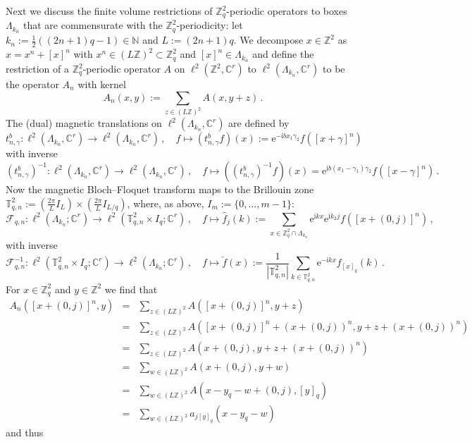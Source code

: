 \documentclass[a4paper]{article}
\newcommand{\T}{\mathbb{T}}
\newcommand{\e}{\mathrm{e}}
\renewcommand{\i}{\mathrm{i}}
\newcommand{\fd}{r}
\newcommand{\N}{\mathbb{N}}
\newcommand{\Z}{\mathbb{Z}}
\newcommand{\C}{\mathbb{C}}
\theoremstyle{plain}
\theoremstyle{definition}
\theoremstyle{remark}
\renewcommand{\(}{\left(}
\renewcommand{\)}{\right)}
\begin{document}
Next we discuss the finite volume restrictions
of $\Z^2_q$-periodic operators to boxes $\Lambda_{k_n}$ that are commensurate with the $\Z^2_q$-periodicity: let 
$k_n:= \frac{1}{2}((2n+1)q-1)\in\N$ and $L:= (2n+1)q$.
We decompose $x\in\Z^2$ as $x=x^n +[x]^n$ with $x^n\in(L\Z)^2\subset \Z^2_q$ and $[x]^n\in\Lambda_{k_n}$ and define the restriction of  a $\Z^2_q$-periodic operator $A$   on $\ell^2(\Z^2,\C^\fd)$   to $\ell^2(\Lambda_{k_n},\C^\fd)$ to be the operator $A_n$ with kernel
\[
A_n(x,y) := \sum_{z\in (L\Z)^2} A(x,y+z)\,.
\]
  The (dual) magnetic translations on $\ell^2(\Lambda_{k_n},\C^\fd)$ are   defined by
\[
t^b_{n,\gamma}:\ell^2(\Lambda_{k_n},\C^\fd)\to \ell^2(\Lambda_{k_n},\C^\fd)\,,\quad f \mapsto (t^b_{n,\gamma} f)(x) := \e^{-\i b x_1\gamma_2}f([x+\gamma]^{n})
\]
with inverse 
\[
(t^b_{n,\gamma})^{-1}:\ell^2(\Lambda_{k_n},\C^\fd)\to \ell^2(\Lambda_{k_n},\C^\fd)\,,\quad f \mapsto ((t^b_{n,\gamma})^{-1} f)(x)  = \e^{\i b (x_1-\gamma_1)\gamma_2}f([x-\gamma]^n)\,.
\]
Now the magnetic Bloch--Floquet transform maps to the   Brillouin zone $\T^2_{q,n}:=  \left(\frac{2\pi}{L}I_L\right)\times \left(\frac{2\pi}{ L} I_{L/q} \right) $, where, as above,  $I_m:=\{0,\ldots,m-1\}$:
\[
\mathcal{F}_{q,n}: \ell^2(\Lambda_{k_n};\C^{\fd}) \to \ell^2(\T^2_{q,n} \times I_q;\C^{\fd})\,,\quad f\mapsto \hat f_j(k) := \sum_{x\in\Z^2_q\cap \Lambda_{k_n}}\e^{\i k x} \e^{\i k_2 j} f([x+(0,j)]^n)\,,
\]
with inverse
\[
\mathcal{F}^{-1}_{q,n}:     \ell^2(\T^2_{q,n} \times I_q;\C^{\fd})\to \ell^2(\Lambda_{k_n};\C^{\fd})\,,\quad f \mapsto \check f(x) := \frac{1}{|\T^2_{q,n}|}\sum_{k\in\T^2_{q,n}} \e^{-\i k x} f_{[x]_q}(k)\,.
\]
For $x \in\Z^2_q$ and $y\in\Z^2$ we find that
\begin{eqnarray*}
A_n([x+(0,j)]^n,y) 
    &=& \sum_{z\in (L\Z)^2} A([x+(0,j)]^n,y+z)
    \\
    &=& \sum_{z\in (L\Z)^2} A([x+(0,j)]^n + (x+(0,j))^n,y+z+ (x+(0,j))^n)
     \\
    &=& \sum_{z\in (L\Z)^2} A(x+(0,j),y+z+ (x+(0,j))^n)
     \\
    &=& \sum_{w\in (L\Z)^2} A(x+(0,j),y+w)
    \\
     &=& \sum_{w\in (L\Z)^2} A(x-y_q-w+(0,j),[y]_q)
      \\
     &=& \sum_{w\in (L\Z)^2} a_{j[y]_q}(x-y_q-w)
\end{eqnarray*}
and thus
\end{document}
